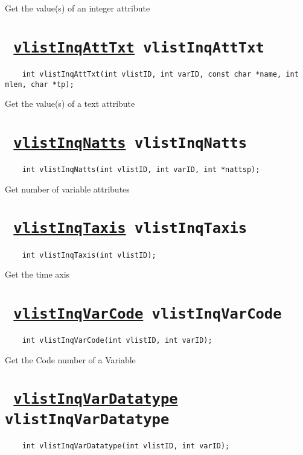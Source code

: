 Get the value(s) of an integer attribute
\ifpdfoutput{}{(\ref{vlistInqAttInt})}


\section*{\tt 
\ifpdf
\hyperref[vlistInqAttTxt]{vlistInqAttTxt}
\else
vlistInqAttTxt
\fi
}
\begin{verbatim}
    int vlistInqAttTxt(int vlistID, int varID, const char *name, int mlen, char *tp);
\end{verbatim}

Get the value(s) of a text attribute
\ifpdfoutput{}{(\ref{vlistInqAttTxt})}


\section*{\tt 
\ifpdf
\hyperref[vlistInqNatts]{vlistInqNatts}
\else
vlistInqNatts
\fi
}
\begin{verbatim}
    int vlistInqNatts(int vlistID, int varID, int *nattsp);
\end{verbatim}

Get number of variable attributes
\ifpdfoutput{}{(\ref{vlistInqNatts})}


\section*{\tt 
\ifpdf
\hyperref[vlistInqTaxis]{vlistInqTaxis}
\else
vlistInqTaxis
\fi
}
\begin{verbatim}
    int vlistInqTaxis(int vlistID);
\end{verbatim}

Get the time axis
\ifpdfoutput{}{(\ref{vlistInqTaxis})}


\section*{\tt 
\ifpdf
\hyperref[vlistInqVarCode]{vlistInqVarCode}
\else
vlistInqVarCode
\fi
}
\begin{verbatim}
    int vlistInqVarCode(int vlistID, int varID);
\end{verbatim}

Get the Code number of a Variable
\ifpdfoutput{}{(\ref{vlistInqVarCode})}


\section*{\tt 
\ifpdf
\hyperref[vlistInqVarDatatype]{vlistInqVarDatatype}
\else
vlistInqVarDatatype
\fi
}
\begin{verbatim}
    int vlistInqVarDatatype(int vlistID, int varID);
\end{verbatim}

